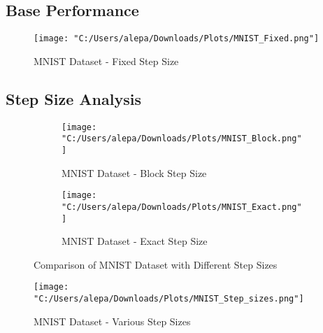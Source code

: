 \documentclass{article}
\begin{document}
\subsection{Base Performance}
\begin{figure}[H]
    \centering
    \texttt{[image: "C:/Users/alepa/Downloads/Plots/MNIST\_Fixed.png"]}
    \caption{MNIST Dataset - Fixed Step Size}
    \label{fig:mnist_fixed}
\end{figure}

\subsection{Step Size Analysis}
\begin{figure}[H]
    \centering
    \begin{subfigure}[b]{0.45\linewidth}
        \centering
        \texttt{[image: "C:/Users/alepa/Downloads/Plots/MNIST\_Block.png"]}
        \caption{MNIST Dataset - Block Step Size}
        \label{fig:mnist_block}
    \end{subfigure}
    \hfill
    \begin{subfigure}[b]{0.45\linewidth}
        \centering
        \texttt{[image: "C:/Users/alepa/Downloads/Plots/MNIST\_Exact.png"]}
        \caption{MNIST Dataset - Exact Step Size}
        \label{fig:mnist_exact}
    \end{subfigure}
    \caption{Comparison of MNIST Dataset with Different Step Sizes}
    \label{fig:mnist_comparison}
\end{figure}

\begin{figure}[H]
    \centering
    \texttt{[image: "C:/Users/alepa/Downloads/Plots/MNIST\_Step\_sizes.png"]}
    \caption{MNIST Dataset - Various Step Sizes}
    \label{fig:mnist_step_sizes}
\end{figure}
\end{document}
